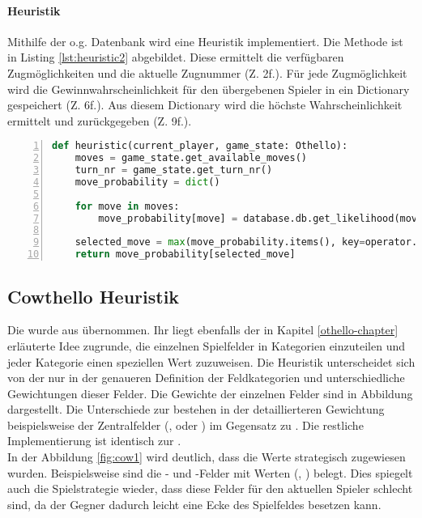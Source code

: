 \paragraph{Heuristik}
\label{para:heuristic1}
Mithilfe der o.g. Datenbank wird eine Heuristik implementiert. Die Methode  ist in Listing \ref{lst:heuristic2} abgebildet. Diese ermittelt die verfügbaren Zugmöglichkeiten und die aktuelle Zugnummer (Z. 2f.). Für jede Zugmöglichkeit wird die Gewinnwahrscheinlichkeit für den übergebenen Spieler in ein Dictionary gespeichert (Z. 6f.). Aus diesem Dictionary wird die höchste Wahrscheinlichkeit ermittelt und zurückgegeben (Z. 9f.).
\begin{lstlisting}[basicstyle=\footnotesize, caption = {Stored Monte-Carlo-Heuristik Funktion}, language = python, captionpos = t , numbers=left, label={lst:heuristic2}]
def heuristic(current_player, game_state: Othello):
	moves = game_state.get_available_moves()
	turn_nr = game_state.get_turn_nr()
	move_probability = dict()

	for move in moves:
		move_probability[move] = database.db.get_likelihood(move, turn_nr, current_player)

	selected_move = max(move_probability.items(), key=operator.itemgetter(1))[0]
 	return move_probability[selected_move]
\end{lstlisting}

\subsection{Cowthello Heuristik}
Die  wurde aus \cite{cow1} übernommen. Ihr liegt ebenfalls der in Kapitel \ref{othello-chapter} erläuterte Idee zugrunde, die einzelnen Spielfelder in Kategorien einzuteilen und jeder Kategorie einen speziellen Wert zuzuweisen. Die Heuristik unterscheidet sich von der  nur in der genaueren Definition der Feldkategorien und unterschiedliche Gewichtungen dieser Felder.
Die Gewichte der einzelnen Felder sind in Abbildung dargestellt. Die Unterschiede zur  bestehen in der detaillierteren Gewichtung beispielsweise der Zentralfelder (,  oder ) im Gegensatz zu . Die restliche Implementierung ist identisch zur .
\\
In der Abbildung \ref{fig:cow1} wird deutlich, dass die Werte strategisch zugewiesen wurden. Beispielsweise sind die - und -Felder mit  Werten (, ) belegt. Dies spiegelt auch die Spielstrategie wieder, dass diese Felder für den aktuellen Spieler schlecht sind, da der Gegner dadurch leicht eine Ecke des Spielfeldes besetzen kann.
